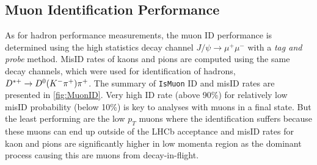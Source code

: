 \subsection{Muon Identification Performance}
\label{muonperf}
As for hadron performance measurements, the muon ID performance is determined using the high statistics decay channel $J/\psi \rightarrow \mu^{+} \mu^{-}$ with a \textit{tag and probe} method. MisID rates of kaons and pions are computed using the same decay channels, which were used for identification of hadrons, $D^{*+} \rightarrow D^{0}({K}^{-}{{\pi}^+}){{\pi}^+}$. The summary of \texttt{IsMuon} \Gls{ID} and misID rates are presented in \autoref{fig:MuonID}. Very high ID rate (above 90\%) for relatively low misID probability (below 10\%) is key to analyses with muons in a final state. But the least performing are the low $p_{T}$ muons where the identification suffers because these muons can end up outside of the \gls{LHCb} acceptance and misID rates for kaon and pions are significantly higher in low momenta region as the dominant process causing this are muons from decay-in-flight.   

